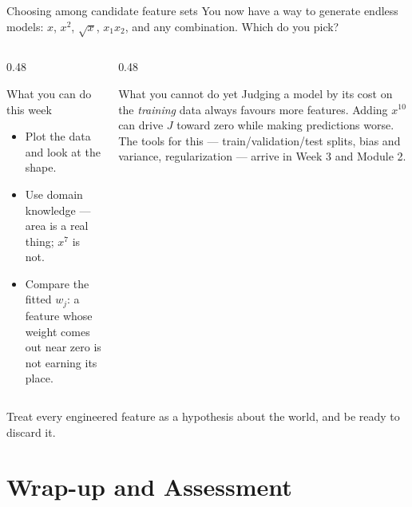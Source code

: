 \documentclass[aspectratio=169,10pt]{beamer}
\begin{document}
\begin{frame}{Choosing among candidate feature sets}
  \footnotesize
  You now have a way to generate endless models: $x$, $x^2$, $\sqrt{x}$, $x_1x_2$, and any
  combination. Which do you pick?
  \vspace{1mm}
  \begin{columns}[T,onlytextwidth]
    \begin{column}{0.48\textwidth}
      \begin{block}{What you can do this week}
        \begin{itemize}
          \item Plot the data and look at the shape.
          \item Use domain knowledge --- area is a real thing; $x^{7}$ is not.
          \item Compare the fitted $w_j$: a feature whose weight comes out near zero is not
                earning its place.
        \end{itemize}
      \end{block}
    \end{column}
    \begin{column}{0.48\textwidth}
      \begin{alertblock}{What you cannot do yet}
        Judging a model by its cost on the \emph{training} data always favours more
        features. Adding $x^{10}$ can drive $J$ toward zero while making predictions worse.
        \vspace{1mm}
        The tools for this --- train/validation/test splits, bias and variance,
        regularization --- arrive in Week 3 and Module 2.
      \end{alertblock}
    \end{column}
  \end{columns}
  \vspace{1mm}
  \begin{keyidea}
    Treat every engineered feature as a hypothesis about the world, and be ready to
    discard it.
  \end{keyidea}
\end{frame}

\section{Wrap-up and Assessment}
\end{document}
